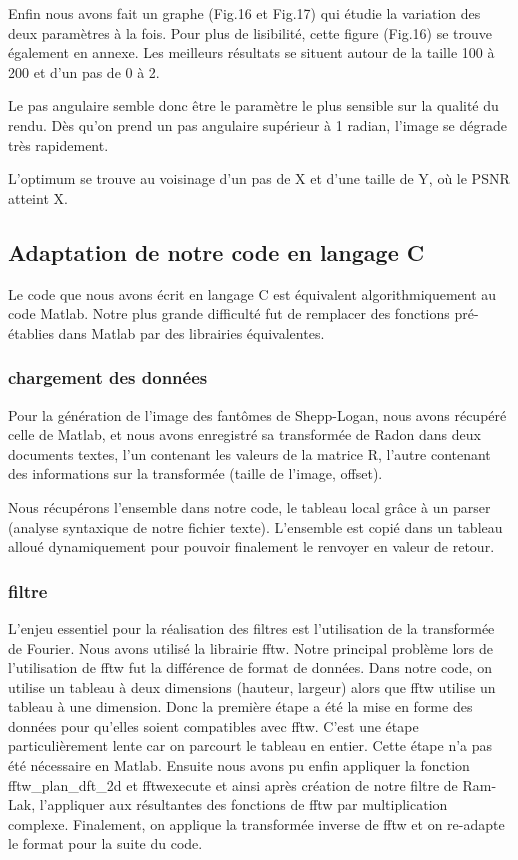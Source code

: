 \documentclass[conference]{IEEEtran}
\begin{document}
Enfin nous avons fait un graphe (Fig.16 et Fig.17) qui étudie la variation des deux paramètres à la fois. Pour plus de lisibilité, cette figure (Fig.16) se trouve également en annexe. Les meilleurs résultats se situent autour de la taille 100 à 200 et d'un pas de 0 à 2.

Le pas angulaire semble donc être le paramètre le plus sensible sur la qualité du rendu. Dès qu'on prend un pas angulaire supérieur à 1 radian, l'image se dégrade très rapidement.

L'optimum se trouve au voisinage d'un pas de X et d'une taille de Y, où le PSNR atteint X.

\subsection{Adaptation de notre code en langage C}

Le code que nous avons écrit en langage C est équivalent algorithmiquement au code Matlab. Notre plus grande difficulté fut de remplacer des fonctions pré-établies dans Matlab par des librairies équivalentes.

\subsubsection{chargement des données }

Pour la génération de l'image des fantômes de Shepp-Logan, nous avons récupéré celle de Matlab, et nous avons enregistré sa transformée de Radon dans deux documents textes, l'un contenant les valeurs de la matrice R, l'autre contenant des informations sur la transformée (taille de l'image, offset).

Nous récupérons l'ensemble dans notre code, le tableau local grâce à un parser (analyse syntaxique de notre fichier texte). L'ensemble est copié dans un tableau alloué dynamiquement pour pouvoir finalement le renvoyer en valeur de retour.

\subsubsection{filtre }

L'enjeu essentiel pour la réalisation des filtres est l'utilisation de la transformée de Fourier. Nous avons utilisé la librairie fftw. Notre principal problème lors de l'utilisation de fftw fut la différence de format de données. Dans notre code, on utilise un tableau à deux dimensions (hauteur, largeur) alors que fftw utilise un tableau à une dimension.
Donc la première étape a été la mise en forme des données pour qu'elles soient compatibles avec fftw. C'est une étape particulièrement lente car on parcourt le tableau en entier. Cette étape n'a pas été nécessaire en Matlab.
Ensuite nous avons pu enfin appliquer la fonction fftw\_plan\_dft\_2d et fftwexecute et ainsi après création de notre filtre de Ram-Lak, l'appliquer aux résultantes des fonctions de fftw par multiplication complexe.
Finalement, on applique la transformée inverse de fftw et on re-adapte le format pour la suite du code.
\end{document}

